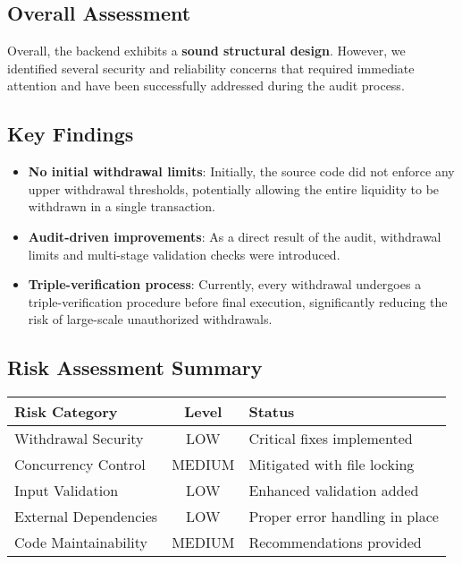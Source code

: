 \documentclass[11pt,a4paper]{article}
\begin{document}
\subsection{Overall Assessment}
Overall, the backend exhibits a \textbf{sound structural design}. However, we identified several security and reliability concerns that required immediate attention and have been successfully addressed during the audit process.

\subsection{Key Findings}
\begin{itemize}
    \item \textbf{No initial withdrawal limits}: Initially, the source code did not enforce any upper withdrawal thresholds, potentially allowing the entire liquidity to be withdrawn in a single transaction.
    \item \textbf{Audit-driven improvements}: As a direct result of the audit, withdrawal limits and multi-stage validation checks were introduced.
    \item \textbf{Triple-verification process}: Currently, every withdrawal undergoes a triple-verification procedure before final execution, significantly reducing the risk of large-scale unauthorized withdrawals.
\end{itemize}

\subsection{Risk Assessment Summary}
\begin{center}
\begin{tabular}{|l|c|l|}
\hline
\textbf{Risk Category} & \textbf{Level} & \textbf{Status} \\
\hline
Withdrawal Security & \textcolor{danzoGreen}{LOW} & Critical fixes implemented \\
Concurrency Control & \textcolor{danzoOrange}{MEDIUM} & Mitigated with file locking \\
Input Validation & \textcolor{danzoGreen}{LOW} & Enhanced validation added \\
External Dependencies & \textcolor{danzoGreen}{LOW} & Proper error handling in place \\
Code Maintainability & \textcolor{danzoOrange}{MEDIUM} & Recommendations provided \\
\hline
\end{tabular}
\end{center}
\end{document}
